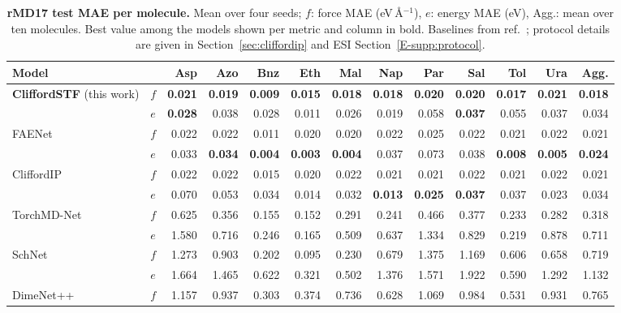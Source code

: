 \begin{table}[t]
\centering
\caption{\textbf{rMD17 test MAE per molecule.} Mean over four seeds; $f$: force MAE (eV\,\AA$^{-1}$), $e$: energy MAE (eV), Agg.: mean over ten molecules. Best value among the models shown per metric and column in bold. Baselines from ref.~; protocol details are given in Section~\ref{sec:cliffordip} and ESI Section~\ref{E-supp:protocol}.}
\label{tab:rmd17_cip}
\fontsize{8.5}{9.6}\selectfont
\setlength{\tabcolsep}{2.4pt}
\renewcommand{\arraystretch}{1.02}
\begin{tabular*}{\textwidth}{@{\extracolsep{\fill}}llrrrrrrrrrrr@{}}
\toprule
Model & & Asp & Azo & Bnz & Eth & Mal & Nap & Par & Sal & Tol & Ura & Agg. \\
\midrule
\textbf{CliffordSTF} (this work) & $f$ & \textbf{0.021} & \textbf{0.019} & \textbf{0.009} & \textbf{0.015} & \textbf{0.018} & \textbf{0.018} & \textbf{0.020} & \textbf{0.020} & \textbf{0.017} & \textbf{0.021} & \textbf{0.018} \\
 & $e$ & \textbf{0.028} & 0.038 & 0.028 & 0.011 & 0.026 & 0.019 & 0.058 & \textbf{0.037} & 0.055 & 0.037 & 0.034 \\
\addlinespace[1pt]
FAENet & $f$ & 0.022 & 0.022 & 0.011 & 0.020 & 0.020 & 0.022 & 0.025 & 0.022 & 0.021 & 0.022 & 0.021 \\
 & $e$ & 0.033 & \textbf{0.034} & \textbf{0.004} & \textbf{0.003} & \textbf{0.004} & 0.037 & 0.073 & 0.038 & \textbf{0.008} & \textbf{0.005} & \textbf{0.024} \\
\addlinespace[1pt]
CliffordIP & $f$ & 0.022 & 0.022 & 0.015 & 0.020 & 0.022 & 0.021 & 0.021 & 0.022 & 0.021 & 0.022 & 0.021 \\
 & $e$ & 0.070 & 0.053 & 0.034 & 0.014 & 0.032 & \textbf{0.013} & \textbf{0.025} & \textbf{0.037} & 0.037 & 0.023 & 0.034 \\
\addlinespace[1pt]
TorchMD-Net & $f$ & 0.625 & 0.356 & 0.155 & 0.152 & 0.291 & 0.241 & 0.466 & 0.377 & 0.233 & 0.282 & 0.318 \\
 & $e$ & 1.580 & 0.716 & 0.246 & 0.165 & 0.509 & 0.637 & 1.334 & 0.829 & 0.219 & 0.878 & 0.711 \\
\addlinespace[1pt]
SchNet & $f$ & 1.273 & 0.903 & 0.202 & 0.095 & 0.230 & 0.679 & 1.375 & 1.169 & 0.606 & 0.658 & 0.719 \\
 & $e$ & 1.664 & 1.465 & 0.622 & 0.321 & 0.502 & 1.376 & 1.571 & 1.922 & 0.590 & 1.292 & 1.132 \\
\addlinespace[1pt]
DimeNet++ & $f$ & 1.157 & 0.937 & 0.303 & 0.374 & 0.736 & 0.628 & 1.069 & 0.984 & 0.531 & 0.931 & 0.765 \\

\end{tabular*}
\end{table}
